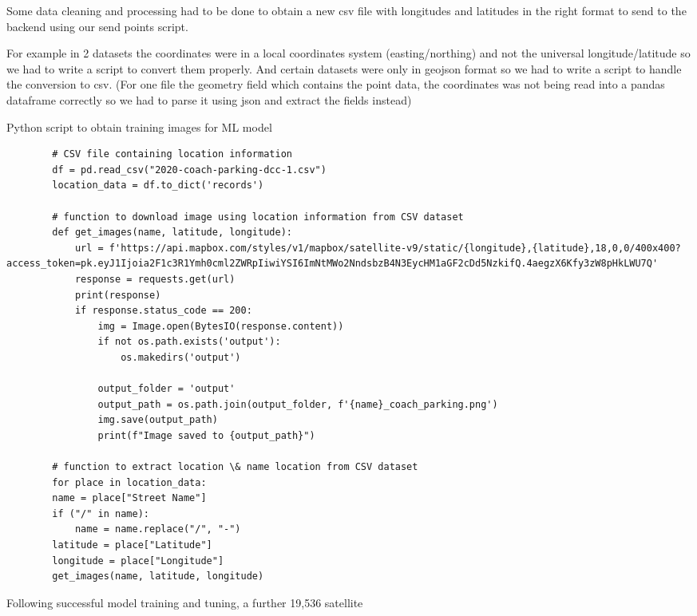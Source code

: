 Some data cleaning and processing had to be done to obtain a new csv file with
longitudes and latitudes in the right format to send to the backend using our
send points script.

For example in 2 datasets the coordinates were in a local coordinates system
(easting/northing) and not the universal longitude/latitude so we had to write a
script to convert them properly. And certain datasets were only in geojson
format so we had to write a script to handle the conversion to csv. (For one
file the geometry field which contains the point data, the coordinates was not
being read into a pandas dataframe correctly so we had to parse it using json
and extract the fields instead)

\begin{listing}[htbp]
    \centering
    \caption{Python script to obtain training images for ML model}
    \begin{verbatim}
        # CSV file containing location information
        df = pd.read_csv("2020-coach-parking-dcc-1.csv")
        location_data = df.to_dict('records')

        # function to download image using location information from CSV dataset
        def get_images(name, latitude, longitude):
            url = f'https://api.mapbox.com/styles/v1/mapbox/satellite-v9/static/{longitude},{latitude},18,0,0/400x400?access_token=pk.eyJ1Ijoia2F1c3R1Ymh0cml2ZWRpIiwiYSI6ImNtMWo2NndsbzB4N3EycHM1aGF2cDd5NzkifQ.4aegzX6Kfy3zW8pHkLWU7Q'
            response = requests.get(url)
            print(response)
            if response.status_code == 200:
                img = Image.open(BytesIO(response.content))
                if not os.path.exists('output'):
                    os.makedirs('output')

                output_folder = 'output'
                output_path = os.path.join(output_folder, f'{name}_coach_parking.png')
                img.save(output_path)
                print(f"Image saved to {output_path}")

        # function to extract location \& name location from CSV dataset
        for place in location_data:
        name = place["Street Name"]
        if ("/" in name):
            name = name.replace("/", "-")
        latitude = place["Latitude"]
        longitude = place["Longitude"]
        get_images(name, latitude, longitude)
    \end{verbatim}
\end{listing}
Following successful model training and tuning, a further 19,536 satellite
